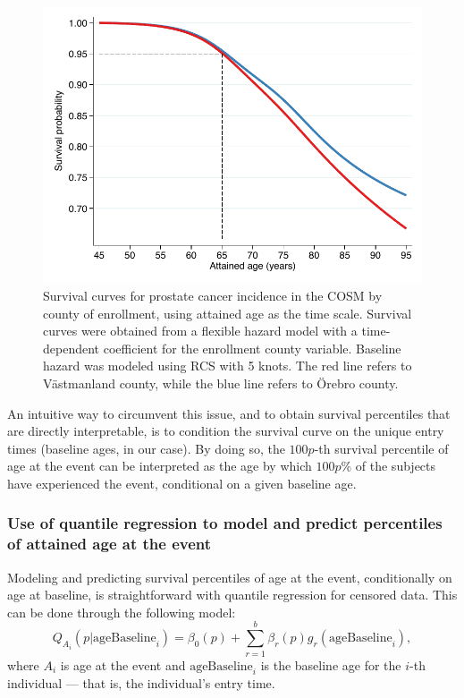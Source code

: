 \begin{figure}[ht]
\centering
\includegraphics[width=.8\linewidth]{figures/timescale.pdf}
\caption[Survival curves for prostate cancer incidence in the COSM (1998--2012) by county of enrollment using age as the time scale]{Survival curves for prostate cancer incidence in the COSM by county of enrollment, using attained age as the time scale. Survival curves were obtained from a flexible hazard model with a time-dependent coefficient for the enrollment county variable. Baseline hazard was modeled using RCS with 5 knots. The red line refers to Västmanland county, while the blue line refers to Örebro county.}
\label{fig:timescale}
\end{figure}



An intuitive way to circumvent this issue, and to obtain survival percentiles that are directly interpretable, is to condition the survival curve on the unique entry times (baseline ages, in our case). By doing so, the  $100p$-th survival percentile of age at the event can be interpreted as the age by which $100p\%$ of the subjects have experienced the event, conditional on a given baseline age.

\subsubsection{Use of quantile regression to model and predict percentiles of attained age at the event}

Modeling and predicting survival percentiles of age at the event, conditionally on age at baseline, is straightforward with quantile regression for censored data. This can be done through the following model:
\begin{equation}
Q_{A_i}(p|\textrm{ageBaseline}_i) = \beta_0(p) + \sum_{r=1}^b \beta_r(p)g_r(\textrm{ageBaseline}_i),
\label{eq:quantileage}
\end{equation}
where $A_i$ is age at the event and $\textrm{ageBaseline}_i$ is the baseline age for the $i$-th individual --- that is, the individual's entry time.  

